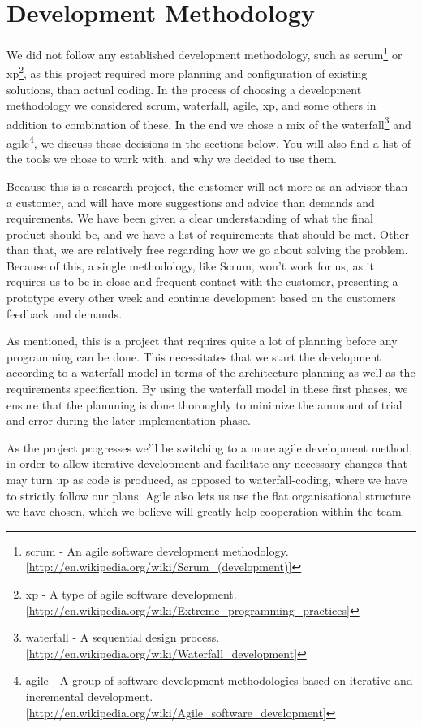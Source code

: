 \section{Development Methodology}\label{Development Methodology} 
    We did not follow any established development methodology, such as \gls{scrum}\footnote{\gls{scrum} - An agile software development methodology. [\url{http://en.wikipedia.org/wiki/Scrum_(development)}]} or \gls{xp}\footnote{\gls{xp} - A type of agile software development. [\url{http://en.wikipedia.org/wiki/Extreme_programming_practices}]}, as this project required more planning and configuration of existing solutions, than actual coding. In the process of choosing a development methodology we considered scrum, waterfall, agile, xp, and some others in addition to combination of these. In the end we chose a mix of the \gls{waterfall}\footnote{\gls{waterfall} - A sequential design process. [\url{http://en.wikipedia.org/wiki/Waterfall_development}]} and \gls{agile}\footnote{\gls{agile} - A group of software development methodologies based on iterative and incremental development. [\url{http://en.wikipedia.org/wiki/Agile_software_development}]}, we discuss these decisions in the sections below. You will also find a list of the tools we chose to work with, and why we decided to use them. 
    
    Because this is a research project, the customer will act more as an advisor than a customer, and will have more suggestions and advice than demands and requirements. We have been given a clear understanding of what the final product should be, and we have a list of requirements that should be met. Other than that, we are relatively free regarding how we go about solving the problem. Because of this, a single methodology, like Scrum, won't work for us, as it requires us to be in close and frequent contact with the customer, presenting a prototype every other week and continue development based on the customers feedback and demands.
    
    As mentioned, this is a project that requires quite a lot of planning before any programming can be done. This necessitates that we start the development according to a waterfall model in terms of the architecture planning as well as the requirements specification. By using the waterfall model in these first phases, we ensure that the plannning is done thoroughly to minimize the ammount of trial and error during the later implementation phase.
    
    As the project progresses we’ll be switching to a more agile development method, in order to allow iterative development and facilitate any necessary changes that may turn up as code is produced, as opposed to waterfall-coding, where we have to strictly follow our plans. Agile also lets us use the flat organisational structure we have chosen, which we believe will greatly help cooperation within the team.
    
